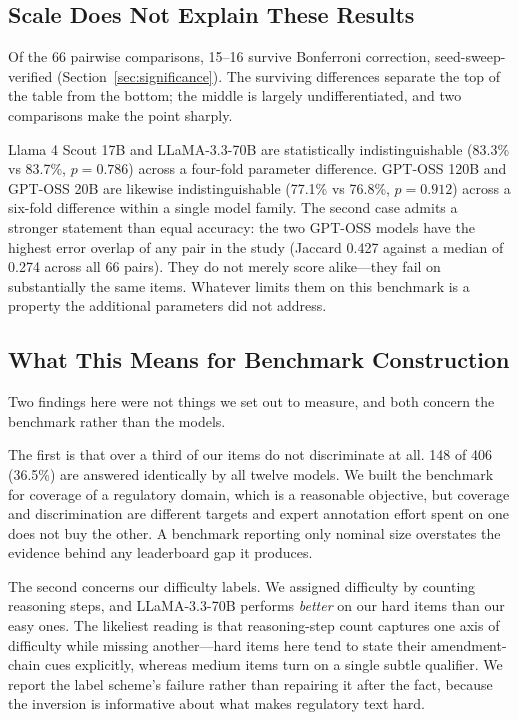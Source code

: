 \subsection{Scale Does Not Explain These Results}

Of the 66 pairwise comparisons, 15--16 survive Bonferroni correction, seed-sweep-verified
(Section~\ref{sec:significance}).
The surviving differences separate the top of the table from the bottom; the middle is largely
undifferentiated, and two comparisons make the point sharply.

Llama 4 Scout 17B and LLaMA-3.3-70B are statistically indistinguishable (83.3\% vs 83.7\%,
$p = 0.786$) across a four-fold parameter difference. GPT-OSS 120B and GPT-OSS 20B are likewise
indistinguishable (77.1\% vs 76.8\%, $p = 0.912$) across a six-fold difference within a single model
family. The second case admits a stronger statement than equal accuracy: the two GPT-OSS models have
the highest error overlap of any pair in the study (Jaccard 0.427 against a median of 0.274 across
all 66 pairs). They do not merely score alike---they fail on substantially the same items. Whatever
limits them on this benchmark is a property the additional parameters did not address.

\subsection{What This Means for Benchmark Construction}

Two findings here were not things we set out to measure, and both concern the benchmark rather than
the models.

The first is that over a third of our items do not discriminate at all. 148 of 406 (36.5\%) are
answered identically by all twelve models. We built the benchmark for coverage of a regulatory domain, which is a reasonable
objective, but coverage and discrimination are different targets and expert annotation effort spent
on one does not buy the other. A benchmark reporting only nominal size overstates the evidence
behind any leaderboard gap it produces.

The second concerns our difficulty labels. We assigned difficulty by counting reasoning steps, and
LLaMA-3.3-70B performs \emph{better} on our hard items than our easy ones. The likeliest reading is
that reasoning-step count captures one axis of difficulty while missing another---hard items here
tend to state their amendment-chain cues explicitly, whereas medium items turn on a single subtle
qualifier. We report the label scheme's failure rather than repairing it after the fact, because the
inversion is informative about what makes regulatory text hard.

